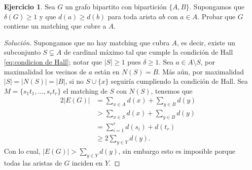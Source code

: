 \documentclass[12pt]{report}
\theoremstyle{plain}
\theoremstyle{definition}
\newtheorem{exercise}[theorem]{Ejercicio}
\newenvironment{solution}{\begin{proof}[Solución]}{\end{proof}}
\newcommand{\abs}[1]{\left \vert #1 \right \vert}
\begin{document}
\begin{exercise}
Sea $G$ un grafo bipartito con bipartición $\{A,B\}$. Supongamos que $\delta (G) \geq 1$ y que $d(a) \geq d(b)$ para toda arista $ab$ con $a \in A$. Probar que $G$ contiene un matching que cubre a $A$.
\end{exercise}
\begin{solution}
Supongamos que no hay matching que cubra $A$, es decir, existe un subconjunto $S \subsetneq A$ de cardinal máximo tal que cumple la condición de Hall \ref{eq:condicion de Hall}; notar que $\abs S \geq 1$ pues $\delta \geq 1$. Sea $a \in A \setminus S$, por maximalidad los vecinos de $a$ están en $N(S) = B$. Más aún, por maximalidad $\abs S = \abs {N(S)} = \abs B$, si no $S \cup \{x\}$ seguiría cumpliendo la condición de Hall. Sea $M = \{s_1 t_1,\ldots, s_{r} t_r \}$ el matching de $S$ con $N(S)$, tenemos que
\begin{align*}
    2 \abs {E(G)} &= \sum_{x \in A} d(x) + \sum_{y \in B} d(y)\\
                &> \sum_{x \in S} d(x) + \sum_{y \in B} d(y) \\
                &= \sum_{i = 1}^r d(s_i) + d(t_r)\\
                &\geq 2 \sum_{y \in Y} d(y).
\end{align*}
Con lo cual, $\abs {E(G)} > \sum_{y \in Y} d(y)$, sin embargo esto es imposible porque todas las aristas de $G$ inciden en $Y$.
\end{solution}
\end{document}
